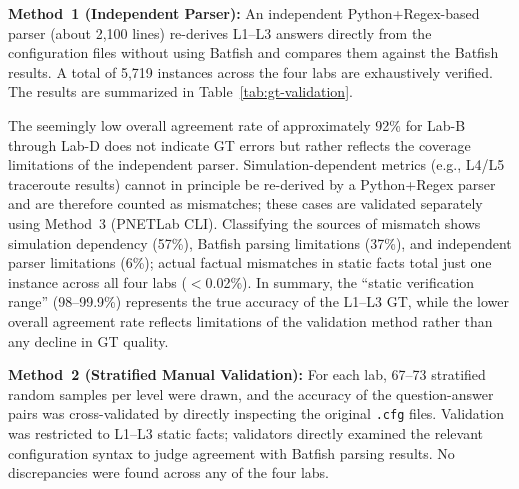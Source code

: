 \textbf{Method~1 (Independent Parser):}
An independent Python+Regex-based parser (about 2,100 lines) re-derives L1--L3 answers directly from the configuration files without using Batfish and compares them against the Batfish results.
A total of 5,719 instances across the four labs are exhaustively verified. The results are summarized in Table~\ref{tab:gt-validation}.


% 
% 

The seemingly low overall agreement rate of approximately 92\% for Lab-B through Lab-D does not indicate GT errors but rather reflects the coverage limitations of the independent parser.
Simulation-dependent metrics (e.g., L4/L5 traceroute results) cannot in principle be re-derived by a Python+Regex parser and are therefore counted as mismatches; these cases are validated separately using Method~3 (PNETLab CLI).
Classifying the sources of mismatch shows simulation dependency (57\%), Batfish parsing limitations (37\%), and independent parser limitations (6\%); actual factual mismatches in static facts total just one instance across all four labs ($<$0.02\%).
In summary, the ``static verification range'' (98--99.9\%) represents the true accuracy of the L1--L3 GT, while the lower overall agreement rate reflects limitations of the validation method rather than any decline in GT quality.

\textbf{Method~2 (Stratified Manual Validation):}
For each lab, 67--73 stratified random samples per level were drawn, and the accuracy of the question-answer pairs was cross-validated by directly inspecting the original \texttt{.cfg} files.
Validation was restricted to L1--L3 static facts; validators directly examined the relevant configuration syntax to judge agreement with Batfish parsing results.
No discrepancies were found across any of the four labs.


